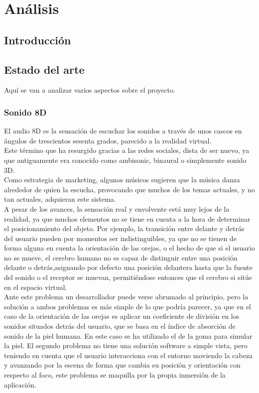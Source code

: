 \section{Análisis}

\subsection{Introducción}

\subsection{Estado del arte}

\quad Aquí se van a analizar varios aspectos sobre el proyecto.\\

	\subsubsection{Sonido 8D}
\quad El audio 8D es la sensación de escuchar los sonidos a través de unos cascos en ángulos de trescientos sesenta grados, parecido a la realidad virtual.\\

\quad Este término que ha resurgido gracias a las redes sociales, dista de ser nuevo, ya que antiguamente era conocido como ambisonic, binaural o simplemente sonido 3D.\\

\quad Como estrategia de marketing, algunos músicos sugieren que la música danza alrededor de quien la escucha, provocando que muchos de los temas actuales, y no tan actuales, adquieran este sistema.\\

\quad A pesar de los avances, la sensación real y envolvente está muy lejos de la realidad, ya que muchos elementos no se tiene en cuenta a la hora de determinar el posicionamiento del objeto. Por ejemplo, la transición entre delante y detrás del usuario pueden por momentos ser indistinguibles, ya que no se tienen de forma alguna en cuenta la orientación de las orejas, o el hecho de que si el usuario no se mueve, el cerebro humano no es capaz de distinguir entre una posición delante o detrás,asignando por defecto una posición delantera hasta que la fuente del sonido o el receptor se muevan, permitiéndose entonces que el cerebro si sitúe en el espacio virtual.\\

\quad Ante este problema un desarrollador puede verse abrumado al principio, pero la solución a ambos problemas es más simple de lo que podría parecer, ya que en el caso de la orientación de las orejas es aplicar un coeficiente de división en los sonidos situados detrás del usuario, que se basa en el índice de absorción de sonido de la piel humana. En este caso se ha utilizado el de la goma para simular la piel. El segundo problema no tiene una solución software a simple vista, pero teniendo en cuenta que el usuario interacciona con el entorno moviendo la cabeza y avanzando por la escena de forma que cambia su posición y orientación con respecto al foco, este problema se maquilla por la propia inmersión de la aplicación.\\

